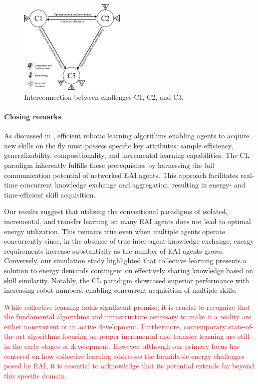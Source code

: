 \documentclass[12pt]{article}
\newcommand\myhl[1]{\textcolor{red}{#1}}
\begin{document}
\begin{figure}[!t]
	\centering
	\includegraphics[width=0.45\textwidth]{fig/grand_challenges_connections.png}
	\caption{Interconnection between challenges C1, C2, and C3.}
	\label{fig:challengesConnected}
\end{figure}

\paragraph*{Closing remarks}
As discussed in \cite{Kaelbling2020foundationefficientrobot}, efficient robotic learning algorithms enabling agents to acquire new skills on the fly must possess specific key attributes: sample efficiency, generalizability, compositionality, and incremental learning capabilities. The CL paradigm inherently fulfills these prerequisites by harnessing the full communication potential of networked EAI agents. This approach facilitates real-time concurrent knowledge exchange and aggregation, resulting in energy- and time-efficient skill acquisition.

Our results suggest that utilizing the conventional paradigms of isolated, incremental, and transfer learning on many EAI agents does not lead to optimal energy utilization. This remains true even when multiple agents operate concurrently since, in the absence of true inter-agent knowledge exchange, energy requirements increase substantially as the number of EAI agents grows. Conversely, our simulation study highlighted that collective learning presents a solution to energy demands contingent on effectively sharing knowledge based on skill similarity. Notably, the CL paradigm showcased superior performance with increasing robot numbers, enabling concurrent acquisition of multiple skills.

\myhl{While collective learning holds significant promise, it is crucial to recognize that the fundamental algorithms and infrastructure necessary to make it a reality are either nonexistent or in active development. Furthermore, contemporary state-of-the-art algorithms focusing on proper incremental and transfer learning are still in the early stages of development. However, although our primary focus has centered on how collective learning addresses the formidable energy challenges posed by EAI, it is essential to acknowledge that its potential extends far beyond this specific domain.}
\end{document}
